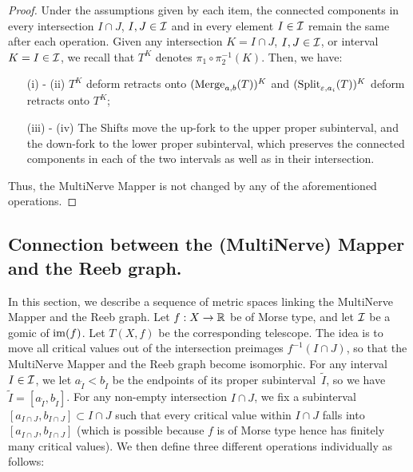 \begin{proof}
Under the assumptions given by each item,
the connected components in every intersection $I\cap J$, $I,J\in\mathcal{I}$ and 
in every element $I\in\mathcal{I}$ remain the same after each operation.
Given any intersection $K=I\cap J$, $I,J\in\mathcal{I}$,
or interval $K=I\in\mathcal{I}$, %
we recall that $T^K$ denotes $\pi_1\circ\pi_2^{-1}(K)$. Then, we have:  %

\begin{itemize}

\item[(i)]- (ii) $T^K$ deform retracts onto $(\mathrm{Merge}_{a,b}(T))^K$ and $(\mathrm{Split}_{\varepsilon,a_i}(T))^K$ deform retracts onto $T^K$; 

\item[(iii)]- (iv) The Shifts move the up-fork to the upper proper subinterval, and the down-fork 
to the lower proper subinterval, which preserves the connected components in each of the
two intervals as well as in their intersection.

\end{itemize}
Thus, the MultiNerve Mapper is not changed by any of the aforementioned operations.   
\end{proof}
 

\subsection{Connection between the (MultiNerve) Mapper and the Reeb graph.}
\label{sec:connection}

In this section, we describe a sequence of metric spaces linking the MultiNerve Mapper and the Reeb graph.
Let $f:X\to\mathbb{R}$ be of Morse type, and let $\mathcal{I}$ be a gomic of $\mathrm{im}(f)$.
Let $T(X,f)$ be the corresponding telescope.
The idea is to move all critical values out 
of the intersection preimages $f^{-1}(I\cap J)$, so that
the MultiNerve Mapper and the Reeb graph become isomorphic.  
For any interval $I\in\mathcal{I}$, we let $a_{\tilde I}<b_{\tilde I}$ be the
endpoints of its proper subinterval~$\tilde I$, so we have $\tilde
I=[a_{\tilde I}, b_{\tilde I}]$. For any non-empty intersection $I\cap J$, 
we fix a subinterval $[a_{I\cap J}, b_{I\cap J}] \subset I\cap J$
such that every critical value within $I\cap J$ falls into $[a_{I\cap J}, b_{I\cap J}]$
(which is possible because $f$ is of Morse type hence has finitely many critical values).  
We then define three different operations individually as follows:

